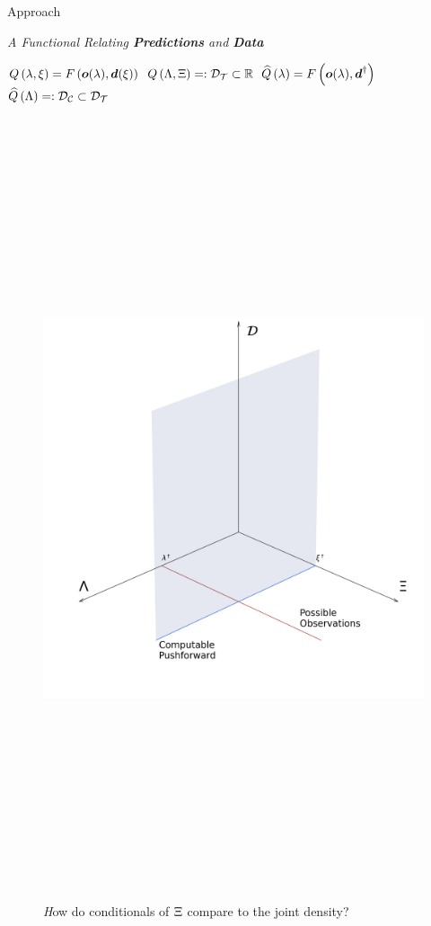 \begin{block}{Approach}
\centering

\centering
\vspace{1cm}
    \emph{\large A Functional Relating \textbf{Predictions} and \textbf{Data}}
    \large
    \begin{itemize}
        $Q \left (\operatorname*{\lambda}, \operatorname*{\xi} \right ) = F \left ( \boldsymbol{o}(\operatorname*{\lambda}), \boldsymbol{d}(\operatorname*{\xi}) \right )$
        $Q \left ( \Lambda, \operatorname*{\Xi} \right ) =: \mathcal{D}_\mathcal{T} \subset \mathbb{R}$
        $\widehat{Q} \left (\operatorname*{\lambda} \right ) = F \left ( \boldsymbol{o}(\operatorname*{\lambda}), \boldsymbol{d}^\dagger \right )$
        $\widehat{Q} \left ( \Lambda \right ) =: \mathcal{D}_\mathcal{C} \subset \mathcal{D}_\mathcal{T}$
    \end{itemize}
    \begin{figure}
        \includegraphics[height=23cm]{diagram}
    \caption*{\large \emph How do conditionals of $\operatorname*{\Xi}$ compare to the joint density?}
    \end{figure}



\end{block}
